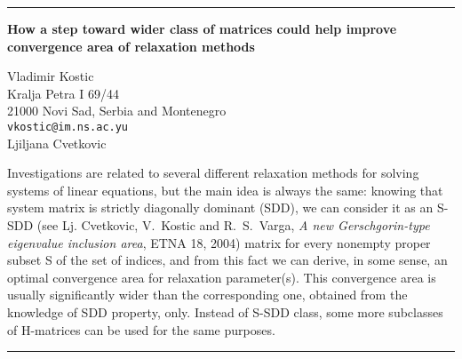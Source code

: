 \documentclass[twosided]{report}
\begin{document}
	\begin{center} \rule{6in}{1pt} \end{center}

\begin{center}
{\large			%
{\bf How a step toward wider class of matrices could help improve \\
	convergence area of relaxation methods}}

	Vladimir Kostic \\
	Kralja Petra I 69/44 \\
	21000 Novi Sad, Serbia and Montenegro \\
	{\tt vkostic@im.ns.ac.yu} \\
	Ljiljana Cvetkovic
\end{center}
Investigations are related to several different relaxation
methods for solving systems of linear equations, but the
main idea is always the same: knowing that system matrix is
strictly diagonally dominant (SDD), we can consider it as an
S-SDD (see Lj. Cvetkovic, V.~Kostic and R.~S.~Varga,
{\em A new Gerschgorin-type eigenvalue inclusion area},
ETNA 18, 2004)
matrix for every nonempty proper subset S of the set
of indices, and from this fact we can derive, in some sense,
an optimal convergence area for relaxation parameter(s).
This convergence area is usually significantly wider than
the corresponding one, obtained from the knowledge of SDD
property, only. Instead of S-SDD class, some more subclasses
of H-matrices can be used for the same purposes.



	\begin{center} \rule{6in}{1pt} \end{center}
\end{document}
